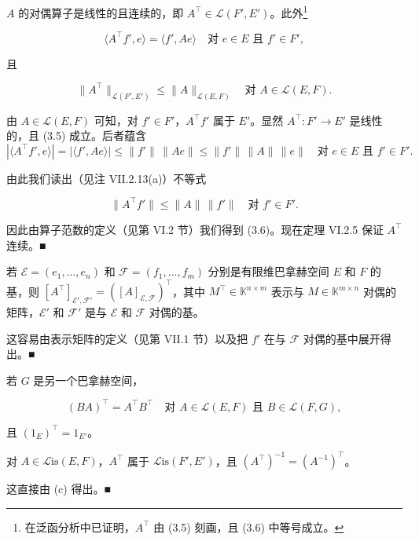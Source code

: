 \begin{remark}

\begin{items}
\item

$ A $ 的对偶算子是线性的且连续的，即 $ A^{\top} \in \mathcal{L}(F',E') $。此外\footnote{在泛函分析中已证明，$ A^{\top} $ 由 (3.5) 刻画，且 (3.6) 中等号成立。}

\begin{equation}
\langle A^{\top}f',e\rangle = \langle f',Ae\rangle \quad \text{对 } e \in E \text{ 且 } f' \in F' ,\tag{3.5}
\end{equation}

且

\begin{equation}
\|A^{\top}\|_{\mathcal{L}(F',E')} \le \|A\|_{\mathcal{L}(E,F)} \quad \text{对 } A \in \mathcal{L}(E,F) .\tag{3.6}
\end{equation}

\proofhead
由 $ A \in \mathcal{L}(E,F) $ 可知，对 $ f' \in F' $，$ A^{\top}f' $ 属于 $ E' $。显然 $ A^{\top} : F' \to E' $ 是线性的，且 (3.5) 成立。后者蕴含
\[
|\langle A^{\top}f',e\rangle| = |\langle f',Ae\rangle| \le \|f'\|\,\|Ae\| \le \|f'\|\,\|A\|\,\|e\| \quad \text{对 } e \in E \text{ 且 } f' \in F' .
\]

由此我们读出（见注 VII.2.13(a)）不等式

\[
\|A^{\top}f'\| \le \|A\|\,\|f'\| \quad \text{对 } f' \in F' .
\]

因此由算子范数的定义（见第 VI.2 节）我们得到 (3.6)。现在定理 VI.2.5 保证 $ A^{\top} $ 连续。\nobreak\hspace{0.35em}■

\item

若 $ \mathcal{E} = (e_{1},\ldots,e_{n}) $ 和 $ \mathcal{F} = (f_{1},\ldots,f_{m}) $ 分别是有限维巴拿赫空间 $ E $ 和 $ F $ 的基，则 $ [A^{\top}]_{\mathcal{E}',\mathcal{F}'} = \left([A]_{\mathcal{E},\mathcal{F}}\right)^{\top} $，其中 $ M^{\top} \in \mathbb{K}^{n \times m} $ 表示与 $ M \in \mathbb{K}^{m \times n} $ 对偶的矩阵，$ \mathcal{E}' $ 和 $ \mathcal{F}' $ 是与 $ \mathcal{E} $ 和 $ \mathcal{F} $ 对偶的基。

\proofhead
这容易由表示矩阵的定义（见第 VII.1 节）以及把 $ f' $ 在与 $ \mathcal{F} $ 对偶的基中展开得出。\nobreak\hspace{0.35em}■
\item

若 $ G $ 是另一个巴拿赫空间，

\[
(BA)^{\top} = A^{\top}B^{\top} \quad \text{对 } A \in \mathcal{L}(E,F) \text{ 且 } B \in \mathcal{L}(F,G) ,
\]

且 $ (1_{E})^{\top} = 1_{E'} $。

\item

对 $ A \in \mathcal{L}\mathrm{is}(E,F) $，$ A^{\top} $ 属于 $ \mathcal{L}\mathrm{is}(F',E') $，且 $ (A^{\top})^{-1} = (A^{-1})^{\top} $。

\proofhead
这直接由 (c) 得出。\nobreak\hspace{0.35em}■
\end{items}

\end{remark}

